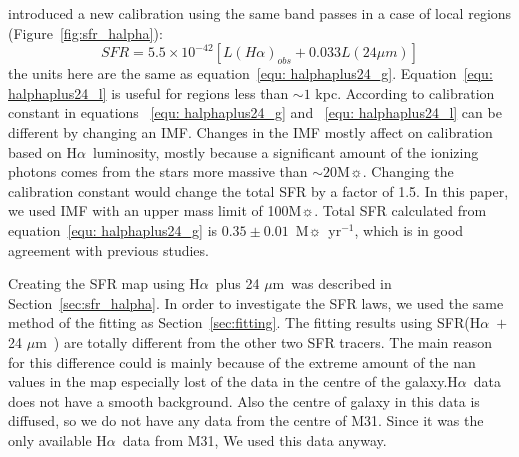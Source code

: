 \documentclass[useAMS,usenatbib]{mn2e}
\newcommand \halpha    {H$\alpha $\ }
\newcommand \um    {$\mu$m\ }
\begin{document}
\cite{Calzetti07} introduced a new calibration using the same band passes in a case of local regions (Figure~\ref{fig:sfr_halpha}):
\begin{equation}
\label{equ: halphaplus24_l}
SFR = 5.5 \times 10^{-42}[L(H{\alpha})_{obs} + 0.033L(24\mu m)]
\end{equation}
the units here are the same as equation~\ref{equ: halphaplus24_g}. Equation~\ref{equ: halphaplus24_l} is useful for regions less than $\sim 1$ kpc. According to  \cite{Calzetti07} calibration constant in equations ~\ref{equ: halphaplus24_g} and ~\ref{equ: halphaplus24_l} can be different by changing an IMF. Changes in the IMF mostly affect on calibration based on \halpha luminosity, mostly because a significant amount of the ionizing photons comes from the stars more massive than $\sim 20$M$\sun$. Changing the calibration constant would change the total SFR by a factor of 1.5. In this paper, we used \cite{Kroupa01} IMF with an upper mass limit of 100M$\sun$. Total SFR calculated from equation~\ref{equ: halphaplus24_g} is $0.35 \pm 0.01$~M$\sun$~yr$^{-1}$, which is in good agreement with previous studies.

Creating the SFR map using \halpha plus 24 \um was described in Section~\ref{sec:sfr_halpha}. In order to investigate the SFR laws, we used the same method of the fitting as Section~\ref{sec:fitting}. The fitting results using SFR(\halpha $+$ 24 \um ) are totally different from the other two SFR tracers. The main reason for this difference could is mainly because of the extreme amount of the nan values in the map especially lost of the data in the centre of the galaxy.\halpha data does not have a smooth background. Also the centre of galaxy in this data is diffused, so we do not have any data from the centre of M31. Since it was the only available \halpha data from M31, We used this data anyway.
\end{document}
